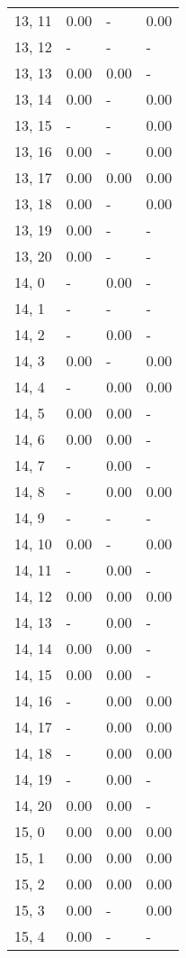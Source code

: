 \begin{table}
\begin{tabular}{llll}
13, 11 &  0.00 &     - &  0.00 \\
13, 12 &     - &     - &     - \\
13, 13 &  0.00 &  0.00 &     - \\
13, 14 &  0.00 &     - &  0.00 \\
13, 15 &     - &     - &  0.00 \\
13, 16 &  0.00 &     - &  0.00 \\
13, 17 &  0.00 &  0.00 &  0.00 \\
13, 18 &  0.00 &     - &  0.00 \\
13, 19 &  0.00 &     - &     - \\
13, 20 &  0.00 &     - &     - \\
14, 0  &     - &  0.00 &     - \\
14, 1  &     - &     - &     - \\
14, 2  &     - &  0.00 &     - \\
14, 3  &  0.00 &     - &  0.00 \\
14, 4  &     - &  0.00 &  0.00 \\
14, 5  &  0.00 &  0.00 &     - \\
14, 6  &  0.00 &  0.00 &     - \\
14, 7  &     - &  0.00 &     - \\
14, 8  &     - &  0.00 &  0.00 \\
14, 9  &     - &     - &     - \\
14, 10 &  0.00 &     - &  0.00 \\
14, 11 &     - &  0.00 &     - \\
14, 12 &  0.00 &  0.00 &  0.00 \\
14, 13 &     - &  0.00 &     - \\
14, 14 &  0.00 &  0.00 &     - \\
14, 15 &  0.00 &  0.00 &     - \\
14, 16 &     - &  0.00 &  0.00 \\
14, 17 &     - &  0.00 &  0.00 \\
14, 18 &     - &  0.00 &  0.00 \\
14, 19 &     - &  0.00 &     - \\
14, 20 &  0.00 &  0.00 &     - \\
15, 0  &  0.00 &  0.00 &  0.00 \\
15, 1  &  0.00 &  0.00 &  0.00 \\
15, 2  &  0.00 &  0.00 &  0.00 \\
15, 3  &  0.00 &     - &  0.00 \\
15, 4  &  0.00 &     - &     - \\

\end{tabular}
\end{table}
